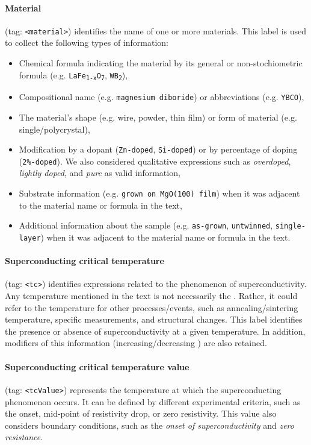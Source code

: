 \paragraph{Material} (tag: \texttt{<material>}) identifies the name of one or more materials. 
This label is used to collect the following types of information: 
\begin{itemize}
    \item Chemical formula indicating the material by its general or non-stochiometric formula (e.g. \texttt{LaFe\textsubscript{1-x}O\textsubscript{7}}, \texttt{WB\textsubscript{2}}),
    \item Compositional name (e.g. \texttt{magnesium diboride}) or abbreviations (e.g. \texttt{YBCO}), 
    \item The material's shape (e.g. wire, powder, thin film) or form of material (e.g. single/polycrystal), 
    \item Modification by a dopant (\texttt{Zn-doped}, \texttt{Si-doped}) or by percentage of doping (\texttt{2\%-doped}). We also considered qualitative expressions such as \textit{overdoped}, \textit{lightly doped}, and \textit{pure} as valid information, 
    \item Substrate information (e.g. \texttt{grown on MgO(100) film}) when it was adjacent to the material name or formula in the text,
    \item Additional information about the sample (e.g. \texttt{as-grown}, \texttt{untwinned}, \texttt{single-layer}) when it was adjacent to the material name or formula in the text. 
\end{itemize}

\paragraph{Superconducting critical temperature} (tag: \texttt{<tc>}) identifies expressions related to the phenomenon of superconductivity. Any temperature mentioned in the text is not necessarily the \tc. Rather, it could refer to the temperature for other processes/events, such as annealing/sintering temperature, specific measurements, and structural changes.
This label identifies the presence or absence of superconductivity at a given temperature.
In addition, modifiers of this information (increasing/decreasing \tc) are also retained. 

\paragraph{Superconducting critical temperature value} (tag: \texttt{<tcValue>}) represents the temperature at which the superconducting phenomenon occurs. 
It can be defined by different experimental criteria, such as the onset, mid-point of resistivity drop, or zero resistivity.
This value also considers boundary conditions, such as the \textit{onset of superconductivity} and \textit{zero resistance}. 

